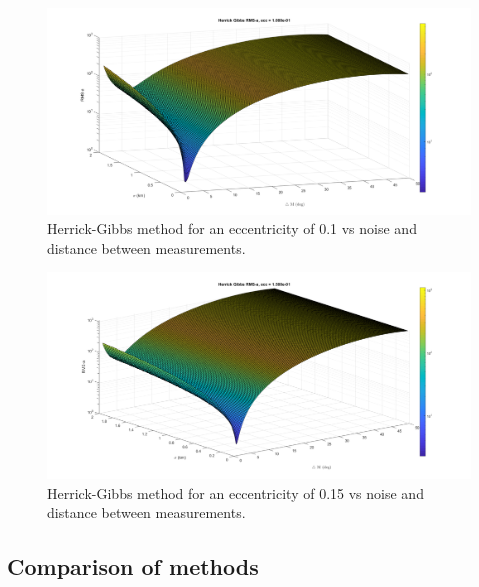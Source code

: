 \documentclass[12pt]{article}
\begin{document}
	\begin{figure}
		\centering
		\includegraphics[width=0.7\linewidth]{herrickgibbs_e_1}
		\caption{Herrick-Gibbs method for an eccentricity of 0.1 vs noise and distance between measurements.}
		\label{fig:herrickgibbse1}
	\end{figure}
	
	\begin{figure}
		\centering
		\includegraphics[width=0.7\linewidth]{herrickgibbs_e_15}
		\caption{Herrick-Gibbs method for an eccentricity of 0.15 vs noise and distance between measurements.}
		\label{fig:herrickgibbse15}
	\end{figure}
\newpage
	\subsection{Comparison of methods}
	
\end{document}
